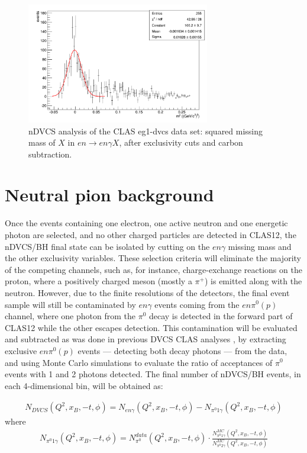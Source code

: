 \begin{figure}
\begin{center}
\includegraphics[width=80mm]{mm2_eng_fit.pdf}
\caption
{nDVCS analysis of the CLAS eg1-dvcs data set: squared missing mass of $X$ in $en\to en\gamma X$, after exclusivity cuts and carbon subtraction.}
\label{daria_sub_fit}
\end{center}
\end{figure}

\section{Neutral pion background }\label{sec_pi0_back}

Once the events containing one electron, one active neutron and one energetic photon are selected, and no other charged particles are detected in CLAS12, the nDVCS/BH final state can be isolated by cutting on the $en\gamma$ missing mass and the other exclusivity variables. These selection criteria will eliminate the majority of the competing channels, such as, for instance, charge-exchange reactions on the proton, where a positively charged meson (mostly a $\pi^+$) is emitted along with the neutron. 
However, due to the finite resolutions of the detectors, the final event sample will still be contaminated by $en\gamma$ events coming from the $en\pi^0(p)$ channel, where one photon from the $\pi^0$ decay is detected in the forward part of CLAS12 while the other escapes detection. This contamination will be evaluated and subtracted as was done in previous DVCS CLAS analyses \cite{fx,erin,pisano,hs}, by extracting exclusive $en\pi^0(p)$ events --- detecting both decay photons --- from the data, and using Monte Carlo simulations to evaluate the ratio of acceptances of $\pi^0$ events with 1 and 2 photons detected. The final number of nDVCS/BH events, in each 4-dimensional bin, will be obtained as:

\begin{eqnarray}
N_{DVCS}(Q^2,x_B,-t,\phi)=N_{en\gamma}(Q^2,x_B,-t,\phi)-N_{\pi^0 1\gamma}(Q^2,x_B,-t,\phi)
\end{eqnarray}
where
\begin{eqnarray}\label{pi0_formula}
N_{\pi^0 1\gamma}(Q^2,x_B,-t,\phi)=N^{data}_{\pi^0}(Q^2,x_B,-t,\phi)\cdot \frac{N^{MC}_{\pi^0 1\gamma}(Q^2,x_B,-t,\phi)}{N^{MC}_{\pi^0 2\gamma}(Q^2,x_B,-t,\phi)}
\end{eqnarray}

